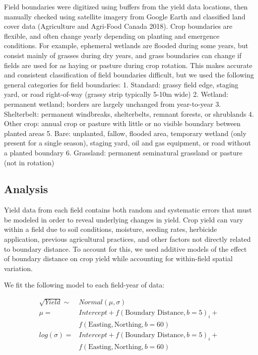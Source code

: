 \documentclass[]{elsarticle} %
\begin{document}
Field boundaries were digitized using buffers from the yield data locations, then manually checked using satellite imagery from Google Earth and classified land cover data (Agriculture and Agri-Food Canada 2018).
Crop boundaries are flexible, and often change yearly depending on planting and emergence conditions.
For example, ephemeral wetlands are flooded during some years, but consist mainly of grasses during dry years, and grass boundaries can change if fields are used for as haying or pasture during crop rotation.
This makes accurate and consistent classification of field boundaries difficult, but we used the following general categories for field boundaries:
1. Standard: grassy field edge, staging yard, or road right-of-way (grassy strip typically 5-10m wide)
2. Wetland: permanent wetland; borders are largely unchanged from year-to-year
3. Shelterbelt: permanent windbreaks, shelterbelts, remnant forests, or shrublands
4. Other crop: annual crop or pasture with little or no visible boundary between planted areas
5. Bare: unplanted, fallow, flooded area, temporary wetland (only present for a single season), staging yard, oil and gas equipment, or road without a planted boundary
6. Grassland: permanent seminatural grassland or pasture (not in rotation)

\hypertarget{analysis}{%
\subsection{Analysis}\label{analysis}}

Yield data from each field contains both random and systematic errors that must be modeled in order to reveal underlying changes in yield.
Crop yield can vary within a field due to soil conditions, moisture, seeding rates, herbicide application, previous agricultural practices, and other factors not directly related to boundary distance.
To account for this, we used additive models of the effect of boundary distance on crop yield while accounting for within-field spatial variation.

We fit the following model to each field-year of data:

\begin{equation}
  \begin{split}
  \sqrt{Yield} \sim & Normal (\mu, \sigma)\\
  \mu = & Intercept + f(\text{Boundary Distance}, b=5)_i + \\
   & f(\text{Easting}, \text{Northing}, b=60)\\
  log(\sigma) =  & Intercept + f(\text{Boundary Distance}, b=5)_i + \\
   & f(\text{Easting}, \text{Northing}, b=60)\\
  \end{split}
  \end{equation}
\end{document}
